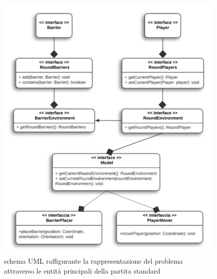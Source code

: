 \documentclass[a4paper,12pt]{report}
\begin{document}
	\begin{figure}
	\includegraphics{modello_del_dominio}
	\centering	
	\caption{schema UML raffigurante la rappresentazione del problema attraverso le entità principali della partita standard}
	\label{img:dominio}
	\end{figure}
\end{document}
